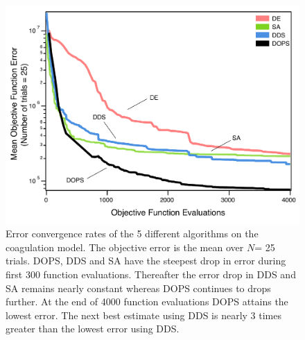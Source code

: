 \documentclass[12pt]{article}
\begin{document}
\begin{figure}[h]
\centering
\includegraphics[width=1.0\textwidth]{./figs/Figure_3_Errors_convergence_v2.pdf}
\caption{Error convergence rates of the 5 different algorithms on the coagulation model. The objective error is the mean over $N$= 25 trials. DOPS, DDS and SA have the steepest drop in error during first 300 function evaluations. Thereafter the error drop in DDS and SA remains nearly constant whereas DOPS continues to drops further. At the end of 4000 function evaluations DOPS attains the lowest error. The next best estimate using DDS is nearly 3 times greater than the lowest error using DDS.
}\label{fig-convergence}
\end{figure}

\clearpage
\end{document}
